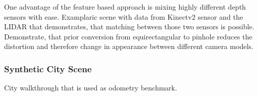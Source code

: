 One advantage of the feature based approach is mixing highly different depth sensors with ease.
Examplaric scene with data from Kinectv2 sensor and the LIDAR that demonstrates, that matching between those two sensors is possible.
Demonstrate, that prior conversion from equirectangular to pinhole reduces the distortion and therefore change in appearance between different camera models.


\subsubsection{Synthetic City Scene}

City walkthrough that is used as odometry benchmark.

